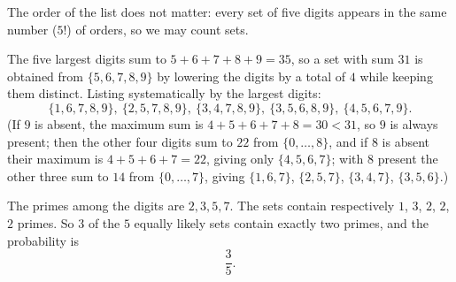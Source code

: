 The order of the list does not matter: every set of five digits appears in the same number ($5!$) of orders, so we may count sets.

The five largest digits sum to $5+6+7+8+9=35$, so a set with sum $31$ is obtained from $\{5,6,7,8,9\}$ by lowering the digits by a total of $4$ while keeping them distinct. Listing systematically by the largest digits:
\[
\{1,6,7,8,9\},\ \{2,5,7,8,9\},\ \{3,4,7,8,9\},\ \{3,5,6,8,9\},\ \{4,5,6,7,9\}.
\]
(If $9$ is absent, the maximum sum is $4+5+6+7+8=30<31$, so $9$ is always present; then the other four digits sum to $22$ from $\{0,\dots,8\}$, and if $8$ is absent their maximum is $4+5+6+7=22$, giving only $\{4,5,6,7\}$; with $8$ present the other three sum to $14$ from $\{0,\dots,7\}$, giving $\{1,6,7\}$, $\{2,5,7\}$, $\{3,4,7\}$, $\{3,5,6\}$.)

The primes among the digits are $2,3,5,7$. The sets contain respectively $1$, $3$, $2$, $2$, $2$ primes. So $3$ of the $5$ equally likely sets contain exactly two primes, and the probability is
\[
\boxed{\dfrac{3}{5}}.
\]
